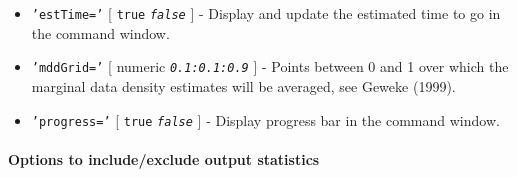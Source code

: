 \begin{itemize}
\item
  \texttt{'estTime='} {[} \texttt{true} \textbar{} \emph{\texttt{false}}
  {]} - Display and update the estimated time to go in the command
  window.
\item
  \texttt{'mddGrid='} {[} numeric \textbar{} \emph{\texttt{0.1:0.1:0.9}}
  {]} - Points between 0 and 1 over which the marginal data density
  estimates will be averaged, see Geweke (1999).
\item
  \texttt{'progress='} {[} \texttt{true} \textbar{}
  \emph{\texttt{false}} {]} - Display progress bar in the command
  window.
\end{itemize}

\paragraph{Options to include/exclude output
statistics}\label{options-to-includeexclude-output-statistics}

